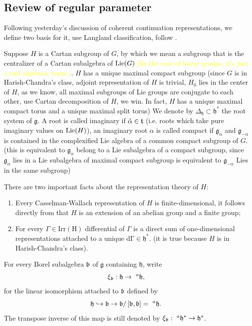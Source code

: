 \documentclass[12pt]{amsart}
\numberwithin{equation}{section}
\newcommand{\fg}{\mathfrak{g}} \newcommand{\fh}{\mathfrak{h}} \newcommand{\fk}{\mathfrak{k}}
\newcommand{\sqbra}[1]{\left[#1\right]}
\begin{document}
\subsection{Review of regular parameter}

Following yesterday's discussion of coherent continuation representations, we define two basis
for it, use Langland classification, follow \cite{BMSZ22}.

Suppose $H$ is a Cartan subgroup of $G$, by which we mean a subgroup that is the centralizer of
a Cartan subalgebra of ${\mathrm{Lie}}(G)$ \textcolor{yellow}{(In the case of linear groups, it's just a
  real algebraic torus.)}. $H$ has a unique maximal compact subgroup (since $G$ is in Harish-Chandra's
class, adjoint representation of $H$ is trivial, $H_0$ lies in the center of $H$, as we know, all
maximal subgroups of Lie groups are conjugate to each other, use Cartan decomposition of $H$, we win. In fact,
$H$ has a unique maximal compact torus and a unique maximal split torus)
We denote by $\Delta_{\fh} \subset \fh^*$ the root system of $\fg$. A root is called imaginary
if $\check{\alpha } \in \mathfrak{t}$ (i.e. roots which take pure imaginary values on ${\mathrm{Lie}}(H)$), an imaginary root $\alpha$ is
called compact if $\fg_{\alpha}$ and $\fg_{-\alpha}$ is contained in the complexified Lie algebra of a common compact subgroup of $G$.(this is equivalent to $\fg_\alpha $ belong to a Lie subalgebra of a compact subgroup, since $\fg_\alpha $ lies in a Lie subalgebra of maximal compact subgroup is equivalent to $\fg_{-\alpha }$ Lies in the same subgroup)


There are two important facts about the representation theory of $H$:
\begin{enumerate}
  \item Every Casselman-Wallach representation of $H$ is finite-dimensional, it follows directly from that $H$ is an extension of an abelian group and a finite group;
  \item For every $\Gamma \in \mathrm{Irr(H)}$ differential of $\Gamma$ is a direct sum of one-dimensional representations attached to a unique $\mathrm{d\Gamma \in \fh^*}$.
        (it is true because $H$ is in Harish-Chandra's class).
\end{enumerate}


For every Borel subalgebra $\mathfrak{b}$ of $\fg$ containing $\fh$, write 
$$\xi_{\fb}: \fh \to \ ^{a}\fh,$$
for the linear isomorphism attached to $\mathfrak{b}$ defined by 
$$\fh \hookrightarrow  \fb \to \fb / \sqbra{\fb,\fb} = \ {^{a}\fh}.$$
The transpose inverse of this map is still denoted by $\xi_{\fb}: \ ^{a}\fh^* \to \fh^*$.\\
\end{document}
